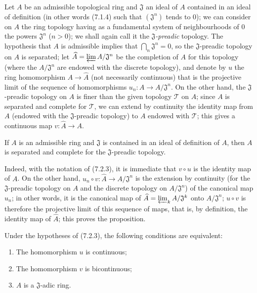 \begin{env}[7.2.3]
\label{0.7.2.3}
Let $A$ be an admissible topological ring and $\mathfrak J$ an ideal of $A$
contained in an ideal of definition (in other words (7.1.4) such that
$(\mathfrak J^n)$ tends to $0$); we can consider on $A$ the ring topology
having as a fundamental system of neighbourhoods of $0$ the powers
$\mathfrak J^n$ ($n>0$); we shall again call it the
\emph{$\mathfrak J$-preadic} topology. The hypothesis that $A$ is admissible implies that
$\bigcap_n\mathfrak J^n=0$, so the $\mathfrak J$-preadic topology on $A$
is separated; let
$\widehat A=\varprojlim A/\mathfrak J^n$ be the completion of $A$ for this topology
(where the $A/\mathfrak J^n$ are endowed with the discrete topology), and denote
by $u$ the ring homomorphism $A\to\widehat A$ (not necessarily
continuous) that is the projective limit of the sequence of homomorphisms
$u_n:A\to A/\mathfrak J^n$. On the other hand, the $\mathfrak J$-preadic topology
on $A$ is finer than the given topology $\mathcal T$ on $A$; since $A$
is separated and complete for $\mathcal T$, we can extend by continuity
the identity map from $A$ (endowed with the $\mathfrak J$-preadic topology)
to $A$ endowed with $\mathcal T$; this gives a continuous map
$v:\widehat A\to A$.
\end{env}

\begin{proposition}[7.2.4]
\label{0.7.2.4}
If $A$ is an admissible ring and $\mathfrak J$ is contained in an ideal of
definition of $A$, then $A$ is separated and complete for the
$\mathfrak J$-preadic topology.
\end{proposition}

Indeed, with the notation of (7.2.3), it is immediate that $v\circ u$ is
the identity map of $A$. On the other hand,
$u_n\circ v:\widehat A\to A/\mathfrak J^n$ is the extension by continuity
(for the $\mathfrak J$-preadic topology on $A$ and the discrete topology on
$A/\mathfrak J^n$) of the canonical map $u_n$; in other words, it is
the canonical map of
$\widehat A=\varprojlim_k A/\mathfrak J^k$ onto $A/\mathfrak J^n$;
$u\circ v$ is therefore the projective limit of this sequence of maps,
that is, by definition, the identity map of $\widehat A$; this
proves the proposition.

\begin{corollary}[7.2.5]
\label{0.7.2.5}
Under the hypotheses of (7.2.3), the following conditions are equivalent:
\begin{enumerate}
  \item[$a)$] The homomorphism $u$ is continuous;


  \item[$b)$] The homomorphism $v$ is bicontinuous;
  \item[$c)$] $A$ is a $\mathfrak J$-adic ring.
\end{enumerate}
\end{corollary}

